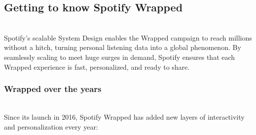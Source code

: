 \subsection{Getting to know Spotify Wrapped}\label{MEylhVVZSX7gmal0sfaWV}
\\
Spotify's scalable System Design enables the Wrapped campaign to reach millions without a hitch, turning personal listening data into a global phenomenon. By seamlessly scaling to meet huge surges in demand, Spotify ensures that each Wrapped experience is fast, personalized, and ready to share.

\subsubsection{Wrapped over the years}\label{N14-IFuqbFReRQcPkyxrO}
\\
Since its launch in 2016, Spotify Wrapped has added new layers of interactivity and personalization every year:

